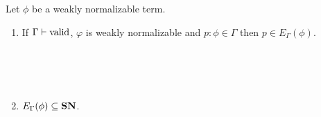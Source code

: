 \begin{lemma}
\label{lm:varcompute1}
Let $\phi$ be a weakly normalizable term.
\begin{enumerate}
\item
If $\Gamma \vdash \mathrm{valid}$, $φ$ is weakly normalizable and $p : \phi \in \Gamma$ then $p \in E_\Gamma(\phi)$.

\begin{code}%
\> \AgdaSymbol{:}  \AgdaSymbol{\{} \AgdaSymbol{\}} \AgdaSymbol{\{} \AgdaSymbol{:}   \AgdaSymbol{\}} \AgdaSymbol{\{} \AgdaSymbol{:}  \AgdaSymbol{\}} \AgdaSymbol{\{} \AgdaSymbol{:}   \AgdaSymbol{\}}  \<[72]%
\>[72]\<%
\\
\>[0]\<[9]%
\>[9]            \AgdaSymbol{(}  \AgdaSymbol{)} \AgdaSymbol{(} \AgdaSymbol{)}\<%
\\
%
\\
\>  \AgdaSymbol{:}  \AgdaSymbol{\{}\AgdaSymbol{\}} \AgdaSymbol{\{} \AgdaSymbol{:}  \AgdaSymbol{\}} \AgdaSymbol{\{} \AgdaSymbol{:}   \AgdaSymbol{\}}       \AgdaSymbol{(} \AgdaSymbol{)} \AgdaSymbol{(}  \AgdaSymbol{)}    \AgdaSymbol{(}  \AgdaSymbol{)} \AgdaSymbol{(} \AgdaSymbol{)}\<%
\end{code}

\item
$E_\Gamma(\phi) \subseteq \mathbf{SN}$.

\begin{code}%
\> \AgdaSymbol{:}  \AgdaSymbol{\{}\AgdaSymbol{\}} \AgdaSymbol{\{} \AgdaSymbol{:}  \AgdaSymbol{\}} \AgdaSymbol{\{} \AgdaSymbol{:}  \AgdaSymbol{\}} \AgdaSymbol{\{} \AgdaSymbol{:}  \AgdaSymbol{\}}        \<%
\end{code}
\end{enumerate}
\end{lemma}

